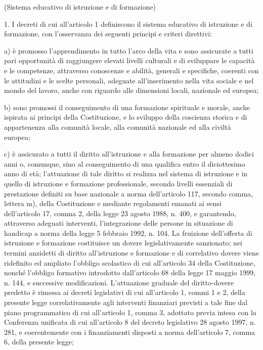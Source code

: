 (Sistema educativo di istruzione e di formazione)

1. I decreti di cui all'articolo 1 definiscono il sistema educativo di istruzione e di formazione, con l'osservanza dei seguenti principi e criteri direttivi:

a) è promosso l'apprendimento in tutto l'arco della vita e sono assicurate a tutti pari opportunità di raggiungere elevati livelli culturali e di sviluppare le capacità e le competenze, attraverso conoscenze e abilità, generali e specifiche, coerenti con le attitudini e le scelte personali, adeguate all'inserimento nella vita sociale e nel mondo del lavoro, anche con riguardo alle dimensioni locali, nazionale ed europea;

b) sono promossi il conseguimento di una formazione spirituale e morale, anche ispirata ai principi della Costituzione, e lo sviluppo della coscienza storica e di appartenenza alla comunità locale, alla comunità nazionale ed alla civiltà europea;

c) è assicurato a tutti il diritto all'istruzione e alla formazione per almeno dodici anni o, comunque, sino al conseguimento di una qualifica entro il diciottesimo anno di età; l'attuazione di tale diritto si realizza nel sistema di istruzione e in quello di istruzione e formazione professionale, secondo livelli essenziali di prestazione definiti su base nazionale a norma dell'articolo 117, secondo comma, lettera m), della Costituzione e mediante regolamenti emanati ai sensi dell'articolo 17, comma 2, della legge 23 agosto 1988, n. 400, e garantendo, attraverso adeguati interventi, l'integrazione delle persone in situazione di handicap a norma della legge 5 febbraio 1992, n. 104. La fruizione dell'offerta di istruzione e formazione costituisce un dovere legislativamente sanzionato; nei termini anzidetti di diritto all'istruzione e formazione e di correlativo dovere viene ridefinito ed ampliato l'obbligo scolastico di cui all'articolo 34 della Costituzione, nonché l'obbligo formativo introdotto dall'articolo 68 della legge 17 maggio 1999, n. 144, e successive modificazioni. L'attuazione graduale del diritto-dovere predetto è rimessa ai decreti legislativi di cui all'articolo 1, commi 1 e 2, della presente legge correlativamente agli interventi finanziari previsti a tale fine dal piano programmatico di cui all'articolo 1, comma 3, adottato previa intesa con la Conferenza unificata di cui all'articolo 8 del decreto legislativo 28 agosto 1997, n. 281, e coerentemente con i finanziamenti disposti a norma dell'articolo 7, comma 6, della presente legge;

